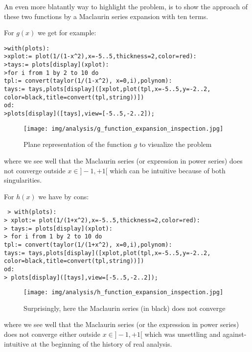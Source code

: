 	An even more blatantly way to highlight the problem, is to show the approach of these two functions by a Maclaurin series expansion with ten terms.
	
	For $g(x)$ we get for example:
	
	\texttt{>with(plots):\\
	>xplot:= plot(1/(1-x\string^2),x=-5..5,thickness=2,color=red):\\
	>tays:= plots[display](xplot):\\
	>for i from 1 by 2 to 10 do\\
		tpl:= convert(taylor(1/(1-x\string^2), x=0,i),polynom):\\
		tays:= tays,plots[display]([xplot,plot(tpl,x=-5..5,y=-2..2,\\
		color=black,title=convert(tpl,string))])\\
		od:\\
	>plots[display]([tays],view=[-5..5,-2..2]);}
	
	\begin{figure}[H]
		\begin{center}
			\texttt{[image: img/analysis/g\_function\_expansion\_inspection.jpg]}
		\end{center}	
		\caption[]{Plane representation of the function $g$ to visualize the problem}
	\end{figure}
	where we see well that the Maclaurin series (or expression in power series) does not converge outside $x \in ]-1,+1[$  which can be intuitive because of both singularities.
	
	For $h(x)$ we have by cons:
	
	\texttt{
	> with(plots):\\
	> xplot:= plot(1/(1+x\string^2),x=-5..5,thickness=2,color=red):\\
	> tays:= plots[display](xplot):\\
	> for i from 1 by 2 to 10 do\\
		tpl:= convert(taylor(1/(1+x\string^2), x=0,i),polynom):\\
		tays:= tays,plots[display]([xplot,plot(tpl,x=-5..5,y=-2..2,\\
		color=black,title=convert(tpl,string))])\\
	od:\\
	> plots[display]([tays],view=[-5..5,-2..2]);\\
	}
	
	\begin{figure}[H]
		\begin{center}
			\texttt{[image: img/analysis/h\_function\_expansion\_inspection.jpg]}
		\end{center}	
		\caption[Divergent Maclaurin series]{Surprisingly, here the Maclaurin series (in black) does not converge}
	\end{figure}
	where we see well that the Maclaurin series (or the expression in power series) does not converge either outside $x \in ]-1,+1[$ which was unsettling and against-intuitive at the beginning of the history of real analysis.
	
